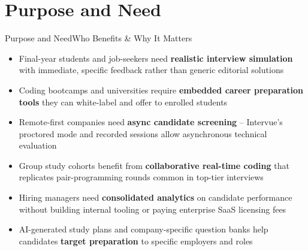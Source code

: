 \documentclass{beamer}
\begin{document}
\section{Purpose and Need}
\begin{frame}{Purpose and Need}{Who Benefits \& Why It Matters}
\begin{itemize}
    \item Final-year students and job-seekers need \textbf{realistic interview simulation} with immediate, specific feedback rather than generic editorial solutions

    \item Coding bootcamps and universities require \textbf{embedded career preparation tools} they can white-label and offer to enrolled students

    \item Remote-first companies need \textbf{async candidate screening} -- Intervue's proctored mode and recorded sessions allow asynchronous technical evaluation

    \item Group study cohorts benefit from \textbf{collaborative real-time coding} that replicates pair-programming rounds common in top-tier interviews

    \item Hiring managers need \textbf{consolidated analytics} on candidate performance without building internal tooling or paying enterprise SaaS licensing fees

    \item AI-generated study plans and company-specific question banks help candidates \textbf{target preparation} to specific employers and roles
\end{itemize}
\end{frame}

\end{document}
